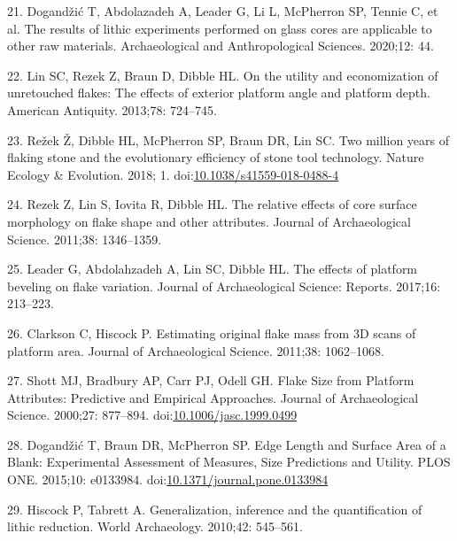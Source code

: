 \documentclass[10pt,letterpaper]{article}
\newenvironment{cslreferences}%
  {}%
  {\par}
\begin{document}
\begin{cslreferences}
\leavevmode\hypertarget{ref-dogandzic_results_2020}{}%
21. Dogandžić T, Abdolazadeh A, Leader G, Li L, McPherron SP, Tennie C,
et al. The results of lithic experiments performed on glass cores are
applicable to other raw materials. Archaeological and Anthropological
Sciences. 2020;12: 44.

\leavevmode\hypertarget{ref-lin_utility_2013-1}{}%
22. Lin SC, Rezek Z, Braun D, Dibble HL. On the utility and
economization of unretouched flakes: The effects of exterior platform
angle and platform depth. American Antiquity. 2013;78: 724--745.

\leavevmode\hypertarget{ref-rezek_two_2018}{}%
23. Režek Ž, Dibble HL, McPherron SP, Braun DR, Lin SC. Two million
years of flaking stone and the evolutionary efficiency of stone tool
technology. Nature Ecology \& Evolution. 2018; 1.
doi:\href{https://doi.org/10.1038/s41559-018-0488-4}{10.1038/s41559-018-0488-4}

\leavevmode\hypertarget{ref-rezek_relative_2011-1}{}%
24. Rezek Z, Lin S, Iovita R, Dibble HL. The relative effects of core
surface morphology on flake shape and other attributes. Journal of
Archaeological Science. 2011;38: 1346--1359.

\leavevmode\hypertarget{ref-leader_effects_2017}{}%
25. Leader G, Abdolahzadeh A, Lin SC, Dibble HL. The effects of platform
beveling on flake variation. Journal of Archaeological Science: Reports.
2017;16: 213--223.

\leavevmode\hypertarget{ref-clarkson_estimating_2011-1}{}%
26. Clarkson C, Hiscock P. Estimating original flake mass from 3D scans
of platform area. Journal of Archaeological Science. 2011;38:
1062--1068.

\leavevmode\hypertarget{ref-shott_flake_2000}{}%
27. Shott MJ, Bradbury AP, Carr PJ, Odell GH. Flake Size from Platform
Attributes: Predictive and Empirical Approaches. Journal of
Archaeological Science. 2000;27: 877--894.
doi:\href{https://doi.org/10.1006/jasc.1999.0499}{10.1006/jasc.1999.0499}

\leavevmode\hypertarget{ref-dogandzic_edge_2015}{}%
28. Dogandžić T, Braun DR, McPherron SP. Edge Length and Surface Area of
a Blank: Experimental Assessment of Measures, Size Predictions and
Utility. PLOS ONE. 2015;10: e0133984.
doi:\href{https://doi.org/10.1371/journal.pone.0133984}{10.1371/journal.pone.0133984}

\leavevmode\hypertarget{ref-hiscock_generalization_2010}{}%
29. Hiscock P, Tabrett A. Generalization, inference and the
quantification of lithic reduction. World Archaeology. 2010;42:
545--561.


\end{cslreferences}
\end{document}
